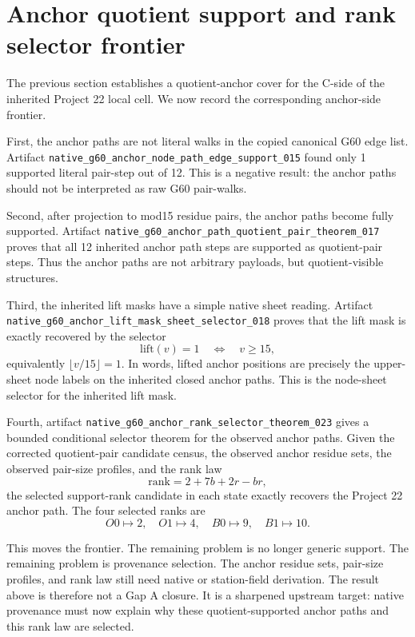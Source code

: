 \section{Anchor quotient support and rank selector frontier}

The previous section establishes a quotient-anchor cover for the C-side of the inherited Project 22 local cell. We now record the corresponding anchor-side frontier.

First, the anchor paths are not literal walks in the copied canonical G60 edge list. Artifact \texttt{native\_g60\_anchor\_node\_path\_edge\_support\_015} found only 1 supported literal pair-step out of 12. This is a negative result: the anchor paths should not be interpreted as raw G60 pair-walks.

Second, after projection to mod15 residue pairs, the anchor paths become fully supported. Artifact \texttt{native\_g60\_anchor\_path\_quotient\_pair\_theorem\_017} proves that all 12 inherited anchor path steps are supported as quotient-pair steps. Thus the anchor paths are not arbitrary payloads, but quotient-visible structures.

Third, the inherited lift masks have a simple native sheet reading. Artifact \texttt{native\_g60\_anchor\_lift\_mask\_sheet\_selector\_018} proves that the lift mask is exactly recovered by the selector
\[
  \mathrm{lift}(v)=1 \quad\Longleftrightarrow\quad v \ge 15,
\]
equivalently \(\lfloor v/15 \rfloor = 1\). In words, lifted anchor positions are precisely the upper-sheet node labels on the inherited closed anchor paths. This is the node-sheet selector for the inherited lift mask.

Fourth, artifact \texttt{native\_g60\_anchor\_rank\_selector\_theorem\_023} gives a bounded conditional selector theorem for the observed anchor paths. Given the corrected quotient-pair candidate census, the observed anchor residue sets, the observed pair-size profiles, and the rank law
\[
  \mathrm{rank}=2+7b+2r-br,
\]
the selected support-rank candidate in each state exactly recovers the Project 22 anchor path. The four selected ranks are
\[
  O0\mapsto 2,\quad O1\mapsto 4,\quad B0\mapsto 9,\quad B1\mapsto 10.
\]

This moves the frontier. The remaining problem is no longer generic support. The remaining problem is provenance selection. The anchor residue sets, pair-size profiles, and rank law still need native or station-field derivation. The result above is therefore not a Gap A closure. It is a sharpened upstream target: native provenance must now explain why these quotient-supported anchor paths and this rank law are selected.
